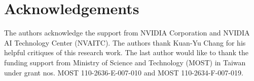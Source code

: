 \documentclass{article}
\begin{document}
 \section{Acknowledgements}
\label{sec:acknowledgements}

The authors acknowledge the support from NVIDIA Corporation and NVIDIA AI Technology Center (NVAITC). The authors thank Kuan-Yu Chang for his helpful critiques of this research work. The last author would like to thank the funding support from Ministry of Science and Technology (MOST) in Taiwan under grant nos. MOST 110-2636-E-007-010 and MOST 110-2634-F-007-019.  






\end{document}
